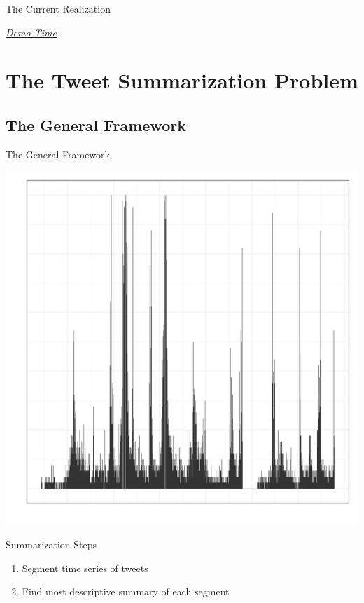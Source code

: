 \documentclass[compress]{beamer}
\begin{document}
\begin{frame}{The Current Realization}

\href{http://fozziethebeat.github.com/tweetolympics/}{\textit{Demo Time}}

\end{frame}

\section{The Tweet Summarization Problem}

\subsection{The General Framework}

\begin{frame}{The General Framework}

\includegraphics[width=\textwidth,height=.50\textheight]{tweet-archery-example.pdf}

\begin{block}{Summarization Steps}
  \begin{enumerate}
      \item Segment time series of tweets
      \item Find most descriptive summary of each segment
  \end{enumerate}
\end{block}

\end{frame}
\end{document}

